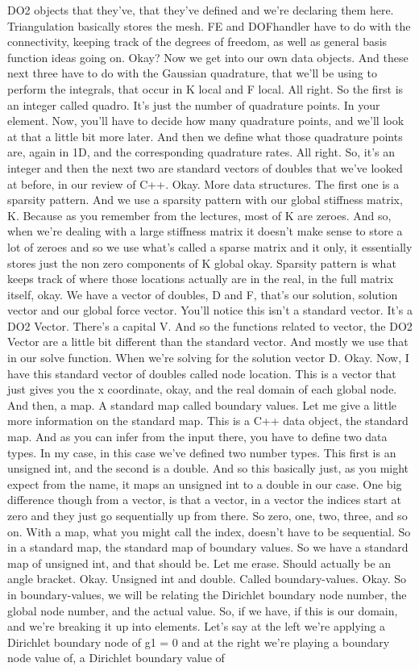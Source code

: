 \documentclass[10pt]{article}
\begin{document}
DO2 objects that they've, that they've defined and we're declaring them here. Triangulation basically stores the mesh. FE and DOFhandler have to do with the connectivity, keeping track of the degrees of freedom, as well as general basis function ideas going on. Okay? Now we get into our own data objects. And these next three have to do with the Gaussian quadrature, that we'll be using to perform the integrals, that occur in K local and F local. All right. So the first is an integer called quadro. It's just the number of quadrature points. In your element. Now, you'll have to decide how many quadrature points, and we'll look at that a little bit more later. And then we define what those quadrature points are, again in 1D, and the corresponding quadrature rates. All right. So, it's an integer and then the next two are standard vectors of doubles that we've looked at before, in our review of C++. Okay. More data structures. The first one is a sparsity pattern. And we use a sparsity pattern with our global stiffness matrix, K. Because as you remember from the lectures, most of K are zeroes. And so, when we're dealing with a large stiffness matrix it doesn't make sense to store a lot of zeroes and so we use what's called a sparse matrix and it only, it essentially stores just the non zero components of K global okay. Sparsity pattern is what keeps track of where those locations actually are in the real, in the full matrix itself, okay. We have a vector of doubles, D and F, that's our solution, solution vector and our global force vector. You'll notice this isn't a standard vector. It's a DO2 Vector. There's a capital V. And so the functions related to vector, the DO2 Vector are a little bit different than the standard vector. And mostly we use that in our solve function. When we're solving for the solution vector D. Okay. Now, I have this standard vector of doubles called node location. This is a vector that just gives you the x coordinate, okay, and the real domain of each global node. And then, a map. A standard map called boundary values. Let me give a little more information on the standard map. This is a C++ data object, the standard map. And as you can infer from the input there, you have to define two data types. In my case, in this case we've defined two number types. This first is an unsigned int, and the second is a double. And so this basically just, as you might expect from the name, it maps an unsigned int to a double in our case. One big difference though from a vector, is that a vector, in a vector the indices start at zero and they just go sequentially up from there. So zero, one, two, three, and so on. With a map, what you might call the index, doesn't have to be sequential. So in a standard map, the standard map of boundary values. So we have a standard map of unsigned int, and that should be. Let me erase. Should actually be an angle bracket. Okay. Unsigned int and double. Called boundary-values. Okay. So in boundary-values, we will be relating the Dirichlet boundary node number, the global node number, and the actual value. So, if we have, if this is our domain, and we're breaking it up into elements. Let's say at the left we're applying a Dirichlet boundary node of g1 = 0 and at the right we're playing a boundary node value of, a Dirichlet boundary value of 
\end{document}
